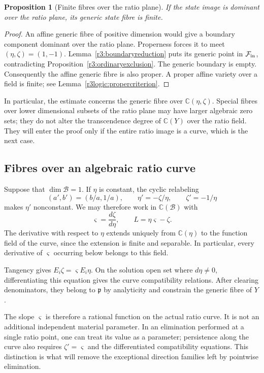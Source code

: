 \documentclass[11pt,a4paper]{article}
\numberwithin{equation}{section}
\theoremstyle{plain}
\newtheorem{proposition}[theorem]{Proposition}
\theoremstyle{definition}
\theoremstyle{remark}
\begin{document}
\begin{proposition}[Finite fibres over the ratio plane]
\label{r3:dominantfinite}
If the state image is dominant over the ratio plane, its generic
state fibre is finite.
\end{proposition}
\begin{proof}
An affine generic fibre of positive dimension would give a boundary
component dominant over the ratio plane. Properness forces it to
meet $(\eta,\zeta)=(1,-1)$. Lemma~\ref{r3:boundaryreduction} puts its
generic point in $\mathcal F_{\rm in}$, contradicting
Proposition~\ref{r3:ordinaryexclusion}. The generic boundary is empty.
Consequently the affine generic fibre is also proper. A proper affine
variety over a field is finite; see
Lemma~\ref{r3logic:propercriterion}.
\end{proof}

In particular, the estimate concerns the generic fibre over
$\mathbb C(\eta,\zeta)$. Special fibres over lower dimensional
subsets of the ratio plane may have larger algebraic zero sets;
they do not alter the transcendence degree of $\mathbb C(Y)$
over the ratio field. They will enter the proof only if the
entire ratio image is a curve, which is the next case.

\subsection{Fibres over an algebraic ratio curve}\label{r3:curves}

Suppose that $\dim\mathscr B=1$. If $\eta$ is constant, the cyclic
relabeling
\[
 (a',b')=(b/a,1/a),\qquad
 \eta'=-\zeta/\eta,\qquad \zeta'=-1/\eta
\]
makes $\eta'$ nonconstant. We may therefore work in
$\mathbb C(\mathscr B)$ with
\[
 \varsigma=\frac{d\zeta}{d\eta},\qquad
 L=\eta\varsigma-\zeta.
\]
The derivative with respect to $\eta$ extends uniquely from
$\mathbb C(\eta)$ to the function field of the curve, since the
extension is finite and separable. In particular, every derivative
of $\varsigma$ occurring below belongs to this field.

Tangency gives $E_i\zeta=\varsigma E_i\eta$. On the solution open
set where $d\eta\ne0$, differentiating this equation gives the
curve compatibility relations. After clearing denominators, they
belong to $\mathfrak p$ by analyticity and constrain the generic
fibre of $Y$.

The slope $\varsigma$ is therefore a rational function on the
actual ratio curve. It is not an additional independent material
parameter. In an elimination performed at a single ratio point,
one can treat its value as a parameter; persistence along the
curve also requires $\zeta'=\varsigma$ and the differentiated
compatibility equations. This distinction is what will remove
the exceptional direction families left by pointwise
elimination.
\end{document}

